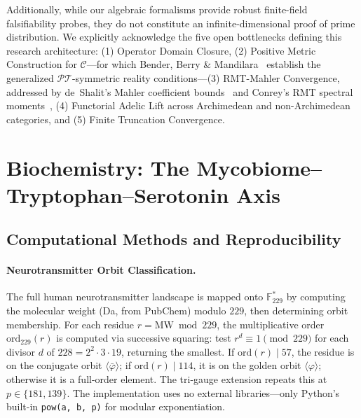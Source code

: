 Additionally, while our algebraic formalisms provide robust finite-field falsifiability probes, they do not constitute an infinite-dimensional proof of prime distribution. We explicitly acknowledge the five open bottlenecks defining this research architecture: (1) Operator Domain Closure, (2) Positive Metric Construction for $\mathcal{C}$---for which Bender, Berry \& Mandilara~\cite{bender-berry-mandilara-12} establish the generalized $\mathcal{PT}$-symmetric reality conditions---(3) RMT-Mahler Convergence, addressed by de~Shalit's Mahler coefficient bounds~\cite{deshalit-mahler-12} and Conrey's RMT spectral moments~\cite{conrey-rmt-12}, (4) Functorial Adelic Lift across Archimedean and non-Archimedean categories, and (5) Finite Truncation Convergence.


\newpage

\section{Biochemistry: The Mycobiome--Tryptophan--Serotonin Axis}


\subsection{Computational Methods and Reproducibility}

\paragraph{Neurotransmitter Orbit Classification.}
The full human neurotransmitter landscape is mapped onto $\mathbb{F}_{229}^*$ by computing the molecular weight (Da, from PubChem) modulo $229$, then determining orbit membership. For each residue $r = \mathrm{MW} \bmod 229$, the multiplicative order $\mathrm{ord}_{229}(r)$ is computed via successive squaring: test $r^d \equiv 1 \pmod{229}$ for each divisor $d$ of $228 = 2^2 \cdot 3 \cdot 19$, returning the smallest. If $\mathrm{ord}(r) \mid 57$, the residue is on the conjugate orbit $\langle \bar{\varphi} \rangle$; if $\mathrm{ord}(r) \mid 114$, it is on the golden orbit $\langle \varphi \rangle$; otherwise it is a full-order element. The tri-gauge extension repeats this at $p \in \{181, 139\}$. The implementation uses no external libraries---only Python's built-in \texttt{pow(a, b, p)} for modular exponentiation.

